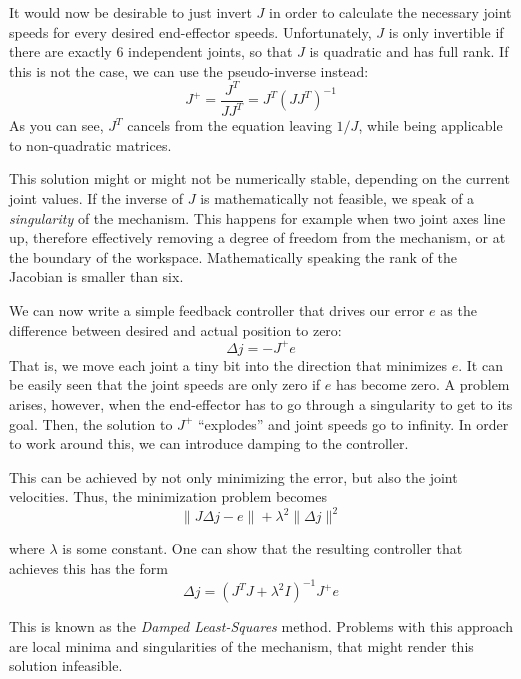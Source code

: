 It would now be desirable to just invert $J$ in order to calculate the necessary joint speeds for every desired end-effector speeds. Unfortunately, $ J$ is only invertible if there are exactly 6 independent joints, so that $ J$ is quadratic and has full rank. If this is not the case, we can use the pseudo-inverse instead:
\begin{equation}
J^+=\frac{J^T}{JJ^T}=J^T(JJ^T)^{-1}
\end{equation}
As you can see, $J^T$ cancels from the equation leaving $1/J$, while being applicable to non-quadratic matrices.

This solution might or might not be numerically stable, depending on the current joint values. If the inverse of $J$ is mathematically not feasible, we speak of a \emph{singularity} of the mechanism. This happens for example when two joint axes line up, therefore effectively removing a degree of freedom from the mechanism, or at the boundary of the workspace. Mathematically speaking the rank of the Jacobian is smaller than six.

We can now write a simple feedback controller that drives our error $e$ as the difference between desired and actual position to zero:
\begin{equation}
\Delta{j}=-J^+e
\end{equation}
That is, we move each joint a tiny bit into the direction that minimizes $e$.
It can be easily seen that the joint speeds are only zero if $e$ has become zero. A problem arises, however, when the end-effector has to go through a singularity to get to its goal. Then, the solution to $ J^+$ ``explodes'' and joint speeds go to infinity. In order to work around this, we can introduce damping to the controller.

This can be achieved by not only minimizing the error, but also the joint velocities. Thus, the minimization problem becomes
\begin{equation}
\|J\Delta j-e\|+\lambda^2\|\Delta j\|^2
\end{equation}

where $\lambda$ is some constant. One can show that the resulting controller that achieves this has the form
\begin{equation}
\Delta j=(J^TJ+\lambda^2 I)^{-1}J^+e
\end{equation}

This is known as the \emph{Damped Least-Squares} method. Problems with this approach are local minima and singularities of the mechanism, that might render this solution infeasible.
